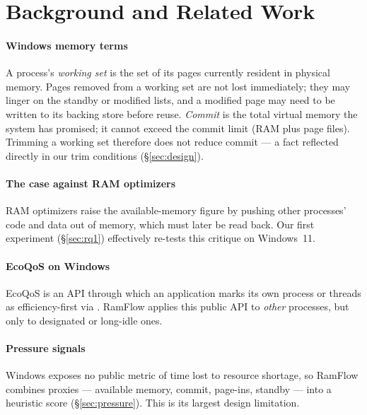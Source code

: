 \documentclass[11pt]{article}
\begin{document}
\section{Background and Related Work}
\label{sec:background}

\paragraph{Windows memory terms}
A process's \emph{working set} is the set of its pages currently resident in physical memory\citep{mswset}. Pages removed from a working set are not lost immediately; they may linger on the standby or modified lists, and a modified page may need to be written to its backing store before reuse\citep{mswset}. \emph{Commit} is the total virtual memory the system has promised; it cannot exceed the commit limit (RAM plus page files). Trimming a working set therefore does not reduce commit --- a fact reflected directly in our trim conditions (\S\ref{sec:design}).

\paragraph{The case against RAM optimizers}
RAM optimizers raise the available-memory figure by pushing other processes' code and data out of memory, which must later be read back\citep{russinovich2004}. Our first experiment (\S\ref{sec:rq1}) effectively re-tests this critique on Windows~11.

\paragraph{EcoQoS on Windows}
EcoQoS is an API through which an application marks its own process or threads as efficiency-first via \citep{ecoqos2021,mssetprocinfo}. RamFlow applies this public API to \emph{other} processes, but only to designated or long-idle ones.

\paragraph{Pressure signals}
Windows exposes no public metric of time lost to resource shortage, so RamFlow combines proxies --- available memory, commit, page-ins, standby --- into a heuristic score (\S\ref{sec:pressure}). This is its largest design limitation.
\end{document}
